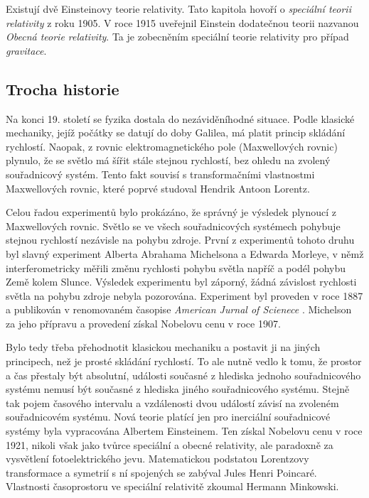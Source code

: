     Existují dvě Einsteinovy teorie relativity. Tato kapitola hovoří o \emph{speciální teorii 
    relativity} z roku \num{1905}. V roce \num{1915} uveřejnil Einstein dodatečnou teorii nazvanou 
    \emph{Obecná teorie relativity}. Ta je zobecněním speciální teorie relativity pro případ 
    \emph{gravitace}.

    \subsection{Trocha historie}
      Na konci 19. století se fyzika dostala do nezáviděníhodné situace. Podle klasické mechaniky,
      jejíž počátky se datují do doby Galilea, má platit princip skládání rychlostí. Naopak, z
      rovnic elektromagnetického pole (Maxwellových rovnic) plynulo, že se světlo má šířit stále
      stejnou rychlostí, bez ohledu na zvolený souřadnicový systém. Tento fakt souvisí s
      transformačními vlastnostmi Maxwellových rovnic, které poprvé studoval Hendrik Antoon Lorentz.


      Celou řadou experimentů bylo prokázáno, že správný je výsledek plynoucí z Maxwellových rovnic.
      Světlo se ve všech souřadnicových systémech pohybuje stejnou rychlostí nezávisle na pohybu
      zdroje. První z experimentů tohoto druhu byl slavný experiment Alberta Abrahama Michelsona a
      Edwarda Morleye, v němž interferometricky měřili změnu rychlosti pohybu světla napříč a podél
      pohybu Země kolem Slunce. Výsledek experimentu byl záporný, žádná závislost rychlosti světla
      na pohybu zdroje nebyla pozorována. Experiment byl proveden v roce 1887 a publikován v
      renomovaném časopise \emph{American Jurnal of Scienece} \cite[s.~22]{MichelMorl1887}.
      Michelson za jeho přípravu a provedení získal Nobelovu cenu v roce 1907. 

      Bylo tedy třeba přehodnotit klasickou mechaniku a postavit ji na jiných principech, než je
      prosté skládání rychlostí. To ale nutně vedlo k tomu, že prostor a čas přestaly být absolutní,
      události současné z hlediska jednoho souřadnicového systému nemusí být současné z hlediska
      jiného souřadnicového systému. Stejně tak pojem časového intervalu a vzdálenosti dvou událostí
      závisí na zvoleném souřadnicovém systému. Nová teorie platící jen pro inerciální souřadnicové
      systémy byla vypracována Albertem Einsteinem. Ten získal Nobelovu cenu v roce 1921, nikoli
      však jako tvůrce speciální a obecné relativity, ale paradoxně za vysvětlení fotoelektrického
      jevu. Matematickou podstatou Lorentzovy transformace a symetrií s ní spojených se zabýval
      Jules Henri Poincaré. Vlastnosti časoprostoru ve speciální relativitě zkoumal Hermann
      Minkowski.

